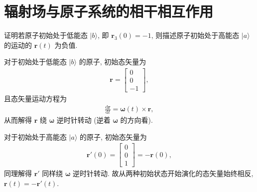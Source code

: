 \documentclass[twoside]{note}
\begin{document}
\fi
\setcounter{chapter}{14}
\chapter{辐射场与原子系统的相干相互作用}
\begin{exe}
    证明若原子初始处于低能态 $\lvert b\rangle$, 即 $\bm{r}_3(0)=-1$, 则描述原子初始处于高能态 $\lvert a\rangle$ 的运动的 $\bm{r}(t)$ 为负值.
\end{exe}
\begin{pf}
    对于初始处于低能态 $\lvert b\rangle$ 的原子, 初始态矢量为
    \begin{align}
        \bm{r}=\begin{bmatrix}
            0\\
            0\\
            -1
        \end{bmatrix},
    \end{align}
    且态矢量运动方程为
    \begin{align}
        \frac{\mathrm{d}\bm{r}}{\mathrm{d}t}=\bm{\omega}(t)\times\bm{r},
    \end{align}
    从而解得 $\bm{r}$ 绕 $\bm{\omega}$ 逆时针转动 (逆着 $\bm{\omega}$ 的方向看).

    对于初始处于高能态 $\lvert a\rangle$ 的原子, 初始态矢量为
    \begin{align}
        \bm{r}'(0)=\begin{bmatrix}
            0\\
            0\\
            1
        \end{bmatrix}=-\bm{r}(0),
    \end{align}
    同理解得 $\bm{r}'$ 同样绕 $\bm{\omega}$ 逆时针转动.
    故从两种初始状态开始演化的态矢量始终相反, $\bm{r}(t)=-\bm{r}'(t)$.
\end{pf}
\end{document}
